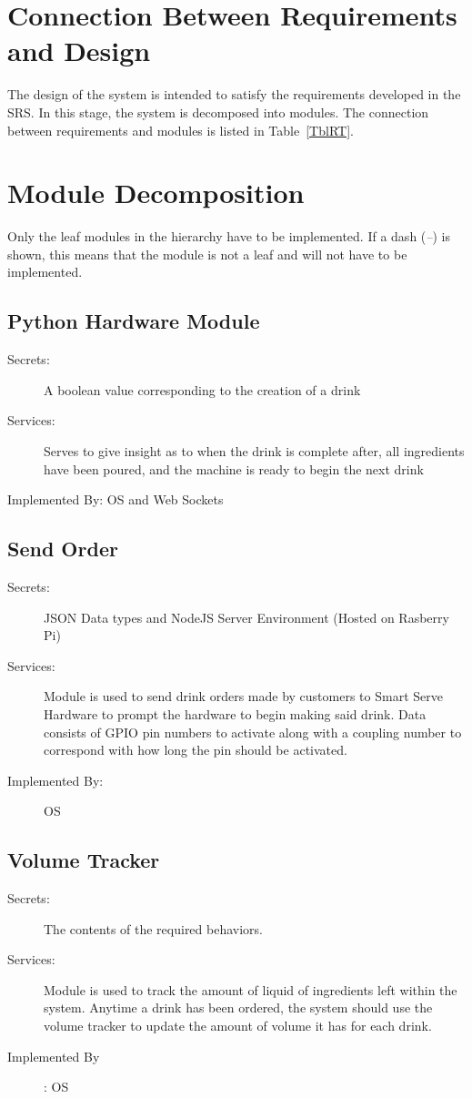 \documentclass[12pt, titlepage]{article}
\begin{document}
\section{Connection Between Requirements and Design} \label{SecConnection}

The design of the system is intended to satisfy the requirements developed in
the SRS. In this stage, the system is decomposed into modules. The connection
between requirements and modules is listed in Table~\ref{TblRT}.

\section{Module Decomposition} \label{SecMD}

Only the leaf modules in the hierarchy have to be implemented. If a dash
(\emph{--}) is shown, this means that the module is not a leaf and will not have
to be implemented.

\subsection{Python Hardware Module}
\begin{description}
\item[Secrets:]A boolean value corresponding to the creation of a drink
\item[Services:]Serves to give insight as to when the drink is complete after, all ingredients have been poured, and the machine is ready to begin the next drink
\item[Implemented By: OS and Web Sockets]
\end{description}

\subsection{Send Order}
\begin{description}
\item[Secrets:]JSON Data types and NodeJS Server Environment (Hosted on Rasberry Pi)
\item[Services:]Module is used to send drink orders made by customers to Smart Serve Hardware to prompt the hardware to begin making said drink. Data consists of GPIO pin numbers to activate along with a coupling number to correspond with how long the pin should be activated.
\item[Implemented By:]OS
\end{description}

\subsection{Volume Tracker}
\begin{description}
\item[Secrets:]The contents of the required behaviors.
\item[Services:]Module is used to track the amount of liquid of ingredients left within the system. Anytime a drink has been ordered, the system should use the volume tracker to update the amount of volume it has for each drink.
\item[Implemented By]: OS
 \end{description}
\end{document}
